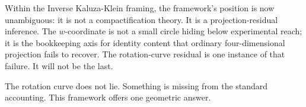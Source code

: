 \documentclass[11pt,a4paper]{article}
\begin{document}
Within the Inverse Kaluza-Klein framing, the framework's position is now
unambiguous: it is not a compactification theory.  It is a projection-residual
inference.  The $w$-coordinate is not a small circle hiding below experimental
reach; it is the bookkeeping axis for identity content that ordinary
four-dimensional projection fails to recover.  The rotation-curve residual is
one instance of that failure.  It will not be the last.

\medskip\noindent
The rotation curve does not lie.  Something is missing from the standard
accounting.  This framework offers one geometric answer.
\end{document}
